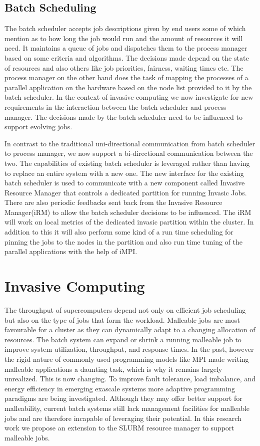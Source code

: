\documentclass{acm_proc_article-sp}
\begin{document}
\subsection{Batch Scheduling}
The batch scheduler accepts job descriptions given by end users some of which mention as to how long the job would run and the amount of resources it will need. It maintains a queue of jobs and dispatches them to the process manager based on some criteria and algorithms. The decisions made depend on the state of resources and also others like job priorities, fairness, waiting times etc. The process manager on the other hand does the task of mapping the processes of a parallel application on the hardware based on the node list provided to it by the batch scheduler. In the context of invasive computing we now investigate for new requirements in the interaction between the batch scheduler and process manager. The decisions made by the batch scheduler need to be influenced to support evolving jobs.\par
\noindent
In contrast to the traditional uni-directional communication from batch scheduler to process manager, we now support a bi-directional communication between the two. The capabilities of existing batch scheduler is leveraged rather than having to replace an entire system with a new one. The new interface for the existing batch scheduler is used to communicate with a new component called Invasive Resource Manager that controls a dedicated partition for running Invasic Jobs. There are also periodic feedbacks sent back from the Invasive Resource Manager(iRM) to allow the batch scheduler decisions to be influenced. The iRM will work on local metrics of the dedicated invasic partition within the cluster. In addition to this it will also perform some kind of a run time scheduling for pinning the jobs to the nodes in the partition and also run time tuning of the parallel applications with the help of iMPI.\par
\section{Invasive Computing}
The throughput of supercomputers depend not only on efficient job scheduling but also on the type of jobs that form the workload. Malleable jobs are most favourable for a cluster as they can dynamically adapt to a changing allocation of resources. The batch system can expand or shrink a running malleable job to improve system utilization, throughput, and response times. In the past, however the rigid nature of commonly used programming models like MPI made writing malleable applications a daunting task, which is why it remains largely unrealized. This is now changing. To improve fault tolerance, load imbalance, and energy efficiency in emerging exascale systems more adaptive programming paradigms\cite{felix}\cite{laxmikant} are being investigated. Although they may offer better support for malleability, current batch systems still lack management facilities for malleable jobs and are therefore incapable of leveraging their potential. In this research work we propose an extension to the SLURM resource manager to support malleable jobs.
\end{document}

